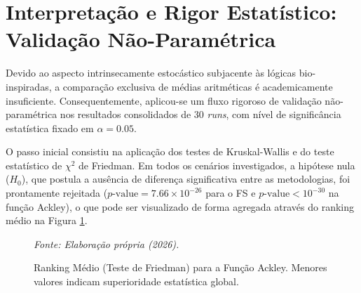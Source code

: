 \documentclass[12pt, a4paper, oneside]{report}
\begin{document}
\clearpage

\section{Interpretação e Rigor Estatístico: Validação Não-Paramétrica}

Devido ao aspecto intrinsecamente estocástico subjacente às lógicas bio-inspiradas, a comparação exclusiva de médias aritméticas é academicamente insuficiente. Consequentemente, aplicou-se um fluxo rigoroso de validação não-paramétrica nos resultados consolidados de 30 \textit{runs}, com nível de significância estatística fixado em $\alpha = 0.05$.

O passo inicial consistiu na aplicação dos testes de Kruskal-Wallis e do teste estatístico de $\chi^2$ de Friedman. Em todos os cenários investigados, a hipótese nula ($H_0$), que postula a ausência de diferença significativa entre as metodologias, foi prontamente rejeitada ($p\text{-value} = 7.66 \times 10^{-26}$ para o FS e $p\text{-value} < 10^{-30}$ na função Ackley), o que pode ser visualizado de forma agregada através do ranking médio na Figura \ref{fig:friedman_ranking}. 

\begin{figure}[H]
  \centering
  \caption{Ranking Médio (Teste de Friedman) para a Função Ackley. Menores valores indicam superioridade estatística global.}
  \vspace{0.2cm}
  
  
  \par\vspace{0.2cm}
  \centerline{\small \textit{Fonte: Elaboração própria (2026).}}
  \label{fig:friedman_ranking}
\end{figure}
\end{document}
